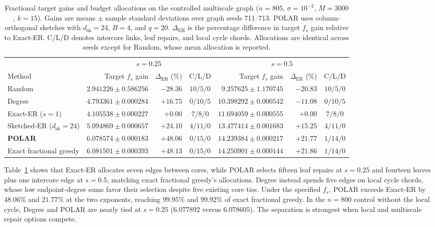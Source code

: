\documentclass[conference]{IEEEtran}
\theoremstyle{definition}
\newcommand{\POLAR}{\textsc{POLAR}}
\newcommand{\dsk}{d_{\mathrm{sk}}}
\begin{document}
\begin{table}[!t]
\centering
\caption{Fractional target gains and budget allocations on the controlled
multiscale graph ($n=805$, $\sigma=10^{-2}$, $M=3000$, $k=15$).
Gains are means $\pm$ sample standard deviations over graph seeds
711--713. \POLAR{} uses column-orthogonal sketches with $\dsk=24$,
$B=4$, and $q=20$. $\Delta_{\mathrm{ER}}$ is the percentage
difference in target $f_s$ gain relative to Exact-ER. C/L/D denotes
intercore links, leaf repairs, and local cycle chords. Allocations
are identical across seeds except for Random, whose mean
allocation is reported.}
\label{tab:multiscale}
\footnotesize
\setlength{\tabcolsep}{5.1pt}
\renewcommand{\arraystretch}{1.12}
\begin{tabular}{@{}l r r c r r c@{}}
\toprule
& \multicolumn{3}{c}{$s=0.25$} & \multicolumn{3}{c}{$s=0.5$}\\
\cmidrule(lr){2-4}\cmidrule(lr){5-7}
Method & Target $f_s$ gain & $\Delta_{\mathrm{ER}}$ (\%) & C/L/D
& Target $f_s$ gain & $\Delta_{\mathrm{ER}}$ (\%) & C/L/D\\
\midrule
Random & $2.941226\pm 0.586256$ & $-28.36$ & $10/5/0$ & $9.257625\pm 1.170745$ & $-20.83$ & $10/5/0$\\
Degree & $4.793361\pm 0.000284$ & $+16.75$ & $0/10/5$ & $10.398292\pm 0.000542$ & $-11.08$ & $0/10/5$\\
Exact-ER ($s=1$) & $4.105538\pm 0.000227$ & $+0.00$ & $7/8/0$ & $11.694059\pm 0.000555$ & $+0.00$ & $7/8/0$\\
Sketched-ER ($\dsk=24$) & $5.094869\pm 0.000657$ & $+24.10$ & $4/11/0$ & $13.477414\pm 0.001683$ & $+15.25$ & $4/11/0$\\
\textbf{\POLAR{}} & $6.078574\pm 0.000183$ & $+48.06$ & $0/15/0$ & $14.239384\pm 0.000217$ & $+21.77$ & $1/14/0$\\
Exact fractional greedy & $6.081501\pm 0.000393$ & $+48.13$ & $0/15/0$ & $14.250901\pm 0.000144$ & $+21.86$ & $1/14/0$\\
\bottomrule
\end{tabular}
\end{table}

Table~\ref{tab:multiscale} shows that Exact-ER allocates seven edges
between cores, while \POLAR{} selects fifteen leaf repairs at $s=0.25$
and fourteen leaves plus one intercore edge at $s=0.5$, matching exact
fractional greedy's allocations. Degree instead spends five edges on
local cycle chords, whose low endpoint-degree sums favor their selection
despite five existing core ties. Under the specified $f_s$, \POLAR{}
exceeds Exact-ER by $48.06\%$ and $21.77\%$ at the two exponents,
reaching $99.95\%$ and $99.92\%$ of exact fractional greedy. In the
$n=800$ control without the local cycle, Degree and \POLAR{} are nearly
tied at $s=0.25$ ($6.077892$ versus $6.078605$). The separation is strongest when local and multiscale repair
options compete.
\end{document}
